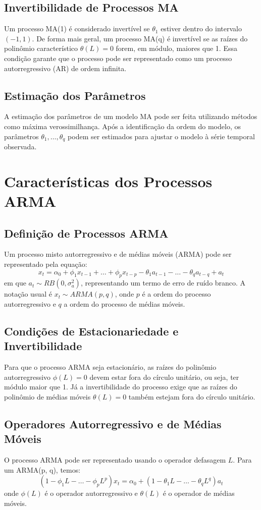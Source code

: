 \documentclass{sciposter}
\begin{document}
\begin{multicols}{3}
\subsection{Invertibilidade de Processos MA}
Um processo MA(1) é considerado invertível se $\theta_1$ estiver dentro do intervalo $(-1, 1)$. De forma mais geral, um processo MA(q) é invertível se as raízes do polinômio característico $\theta(L) = 0$ forem, em módulo, maiores que 1. Essa condição garante que o processo pode ser representado como um processo autorregressivo (AR) de ordem infinita.

\subsection{Estimação dos Parâmetros}
A estimação dos parâmetros de um modelo MA pode ser feita utilizando métodos como máxima verossimilhança. Após a identificação da ordem do modelo, os parâmetros $\theta_1, \dots, \theta_q$ podem ser estimados para ajustar o modelo à série temporal observada.

\section{\textbf{Características dos Processos ARMA}}

\subsection{Definição de Processos ARMA}
Um processo misto autorregressivo e de médias móveis (ARMA) pode ser representado pela equação:
\[
x_t = \alpha_0 + \phi_1 x_{t-1} + \dots + \phi_p x_{t-p} - \theta_1 a_{t-1} - \dots - \theta_q a_{t-q} + a_t
\]
em que $a_t \sim RB(0, \sigma_a^2)$, representando um termo de erro de ruído branco. A notação usual é $x_t \sim ARMA(p, q)$, onde $p$ é a ordem do processo autorregressivo e $q$ a ordem do processo de médias móveis.

\subsection{Condições de Estacionariedade e Invertibilidade}
Para que o processo ARMA seja estacionário, as raízes do polinômio autorregressivo $\phi(L) = 0$ devem estar fora do círculo unitário, ou seja, ter módulo maior que 1. Já a invertibilidade do processo exige que as raízes do polinômio de médias móveis $\theta(L) = 0$ também estejam fora do círculo unitário.

\subsection{Operadores Autorregressivo e de Médias Móveis}
O processo ARMA pode ser representado usando o operador defasagem $L$. Para um ARMA(p, q), temos:
\[
(1 - \phi_1 L - \dots - \phi_p L^p) x_t = \alpha_0 + (1 - \theta_1 L - \dots - \theta_q L^q) a_t
\]
onde $\phi(L)$ é o operador autorregressivo e $\theta(L)$ é o operador de médias móveis.


\end{multicols}
\end{document}
